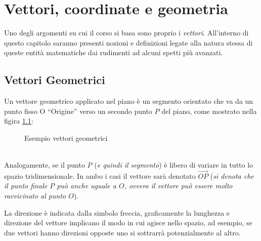 
\chapter{Vettori, coordinate e geometria}
\label{chap:vettcoordegeo}
Uno degli argomenti su cui il corso si basa sono proprio i \textit{vettori}. All'interno di questo capitolo saranno presenti nozioni e definizioni legate alla natura stessa di queste entità matematiche dai rudimenti ad alcuni spetti più avanzati.

\section{Vettori Geometrici}
\label{sec:vettorigeo}
\begin{defi}
  \label{def:vettorigeo}
  Un vettore geometrico applicato nel piano è un segmento orientato che va da un punto fisso O ``Origine'' verso un secondo punto $P$ del piano, come mostrato nella figira \ref{fig:vettorigeo}: 
  \begin{figure}[ht!]
    \centering
    \resizebox{3cm}{!}{
      
    }
    \caption{Esempio vettori geometrici}
    \label{fig:vettorigeo}
  \end{figure}\\
  Analogamente, se il punto $P$ (\textit{e quindi il segmento}) è libero di variare in tutto lo spazio tridimensionale. In ambo i casi il vettore sarà denotato $\vec{OP}$ (\textit{si denota che il punto finale $P$ può anche uguale a $O$, ovvero il vettore può essere molto ravvicinato al punto $O$}).
\end{defi}
\begin{nota}
  \label{nota:vettorigeo}
  La direzione è indicata dalla simbolo freccia, graficamente la lunghezza e direzione del vettore implicano il modo in cui agisce nello spazio, ad esempio, se due vettori hanno direzioni opposte uno si sottrarrà potenzialmente al altro.
\end{nota}

